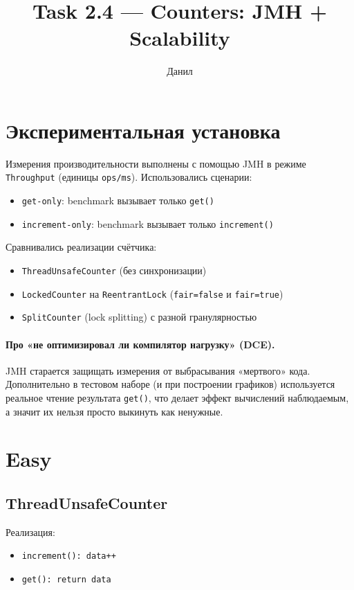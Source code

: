 \documentclass[a4paper,12pt]{article}
\title{Task 2.4 --- Counters: JMH + Scalability}
\author{Данил}
\date{}
\begin{document}
\maketitle
\sloppy

\section{Экспериментальная установка}

Измерения производительности выполнены с помощью JMH в режиме \texttt{Throughput}
(единицы \texttt{ops/ms}). Использовались сценарии:
\begin{itemize}
  \item \texttt{get-only}: benchmark вызывает только \texttt{get()}
  \item \texttt{increment-only}: benchmark вызывает только \texttt{increment()}
\end{itemize}

Сравнивались реализации счётчика:
\begin{itemize}
  \item \texttt{ThreadUnsafeCounter} (без синхронизации)
  \item \texttt{LockedCounter} на \texttt{ReentrantLock} (\texttt{fair=false} и \texttt{fair=true})
  \item \texttt{SplitCounter} (lock splitting) с разной гранулярностью
\end{itemize}

\paragraph{Про «не оптимизировал ли компилятор нагрузку» (DCE).}
JMH старается защищать измерения от выбрасывания «мертвого» кода.
Дополнительно в тестовом наборе (и при построении графиков) используется реальное чтение результата
\texttt{get()}, что делает эффект вычислений наблюдаемым, а значит их нельзя просто выкинуть как ненужные.

\section{Easy}

\subsection{ThreadUnsafeCounter}

Реализация:
\begin{itemize}
  \item \texttt{increment(): data++}
  \item \texttt{get(): return data}
\end{itemize}
\end{document}
